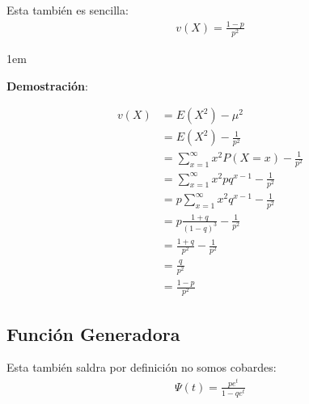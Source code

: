 \documentclass[12pt, fleqn]{report}                             %
\newenvironment{SmallIndentation}[1][0.75em]                    %
        {\begin{adjustwidth}{#1}{}\begin{footnotesize}}             %
        {\end{footnotesize}\end{adjustwidth}}                       %
\theoremstyle{break}                                            %
\begin{document}
                Esta también es sencilla:
                \begin{align*}
                    v(X) = \frac{1-p}{p^2}
                \end{align*}

                \begin{SmallIndentation}[1em]
                    \textbf{Demostración}:
                    
                    \begin{align*}
                        v(X) 
                            &= E(X^2) - \mu^2                                           \\
                            &= E(X^2) - \frac{1}{p^2}                                   \\
                            &= \sum_{x=1}^\infty x^2P(X = x) - \frac{1}{p^2}            \\
                            &= \sum_{x=1}^\infty x^2 p q^{x-1} - \frac{1}{p^2}          \\
                            &= p\sum_{x=1}^\infty x^2 q^{x-1} - \frac{1}{p^2}           \\
                            &= p\frac{1+q}{(1-q)^3} - \frac{1}{p^2}                     \\
                            &= \frac{1+q}{p^2} - \frac{1}{p^2}                          \\
                            &= \frac{q}{p^2}                                            \\
                            &= \frac{1-p}{p^2}
                    \end{align*}
                
                \end{SmallIndentation}

                 
            \clearpage
            \subsection{Función Generadora}   

                Esta también saldra por definición no somos cobardes:
                \begin{align*}
                    \Psi (t) = \frac{pe^t}{1-qe^t}  
                \end{align*}
\end{document}
